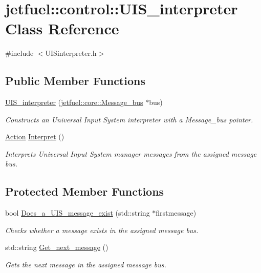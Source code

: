 \hypertarget{classjetfuel_1_1control_1_1UIS__interpreter}{}\section{jetfuel\+:\+:control\+:\+:U\+I\+S\+\_\+interpreter Class Reference}
\label{classjetfuel_1_1control_1_1UIS__interpreter}


{\ttfamily \#include $<$U\+I\+Sinterpreter.\+h$>$}

\subsection*{Public Member Functions}
\begin{DoxyCompactItemize}
\item 
\hyperlink{classjetfuel_1_1control_1_1UIS__interpreter_acd4a4c57e4f2413d68d494f8786fea64}{U\+I\+S\+\_\+interpreter} (\hyperlink{classjetfuel_1_1core_1_1Message__bus}{jetfuel\+::core\+::\+Message\+\_\+bus} $\ast$bus)
\begin{DoxyCompactList}\small\item\em Constructs an Universal Input System interpreter with a Message\+\_\+bus pointer. \end{DoxyCompactList}\item 
\hyperlink{structjetfuel_1_1control_1_1Action}{Action} \hyperlink{classjetfuel_1_1control_1_1UIS__interpreter_ab298d59fded69955c059fb33e4ddb3ee}{Interpret} ()
\begin{DoxyCompactList}\small\item\em Interprets Universal Input System manager messages from the assigned message bus. \end{DoxyCompactList}\end{DoxyCompactItemize}
\subsection*{Protected Member Functions}
\begin{DoxyCompactItemize}
\item 
bool \hyperlink{classjetfuel_1_1control_1_1UIS__interpreter_a78d705a1fa28b4ee0ff168f70707f1ee}{Does\+\_\+a\+\_\+\+U\+I\+S\+\_\+message\+\_\+exist} (std\+::string $\ast$firstmessage)
\begin{DoxyCompactList}\small\item\em Checks whether a message exists in the assigned message bus. \end{DoxyCompactList}\item 
std\+::string \hyperlink{classjetfuel_1_1control_1_1UIS__interpreter_ac385462d25e7be509fad46874dcb40e0}{Get\+\_\+next\+\_\+message} ()
\begin{DoxyCompactList}\small\item\em Gets the next message in the assigned message bus. \end{DoxyCompactList}\end{DoxyCompactItemize}


